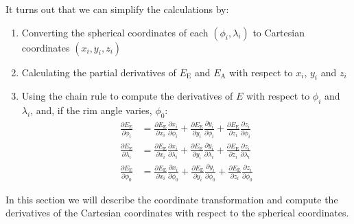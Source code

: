 \documentclass{article}
\newcommand{\EE}{\ensuremath{E_\mathrm{E}}\xspace}
\newcommand{\EA}{\ensuremath{E_\mathrm{A}}\xspace}
\begin{document}
It turns out that we can simplify the calculations by:
\begin{enumerate}
\item Converting the spherical coordinates of each $(\phi_i, \lambda_i)$ to
   Cartesian coordinates $(x_i, y_i, z_i)$
 \item Calculating the partial derivatives of $\EE$ and $\EA$ with
   respect to $x_i$, $y_i$ and $z_i$
 \item Using the chain rule to compute the derivatives of $E$ with
   respect to $\phi_i$ and $\lambda_i$, and, if the rim angle varies,
   $\phi_0$:
\begin{equation}
  \begin{split} 
  \frac{\partial\EE}{\partial \phi_i} &  =
  \frac{\partial\EE}{\partial x_i}\frac{\partial x_i}{\partial
    \phi_i}
  +   \frac{\partial\EE}{\partial y_i}\frac{\partial y_i}{\partial
    \phi_i}
    +   \frac{\partial\EE}{\partial z_i}\frac{\partial z_i}{\partial
    \phi_i} \\
  \frac{\partial\EE}{\partial \lambda_i} &  =
  \frac{\partial\EE}{\partial x_i}\frac{\partial x_i}{\partial
    \lambda_i}
  +   \frac{\partial\EE}{\partial y_i}\frac{\partial y_i}{\partial
    \lambda_i}
    +   \frac{\partial\EE}{\partial z_i}\frac{\partial z_i}{\partial
      \lambda_i} \\
    \frac{\partial\EE}{\partial \phi_0} &  =
  \frac{\partial\EE}{\partial x_i}\frac{\partial x_i}{\partial
    \phi_0}
  +   \frac{\partial\EE}{\partial y_i}\frac{\partial y_i}{\partial
    \phi_0}
    +   \frac{\partial\EE}{\partial z_i}\frac{\partial z_i}{\partial
    \phi_0}
  \end{split}
\end{equation}
\end{enumerate}
In this section we will describe the coordinate transformation and
compute the derivatives of the Cartesian coordinates with respect to
the spherical coordinates.
\end{document}
